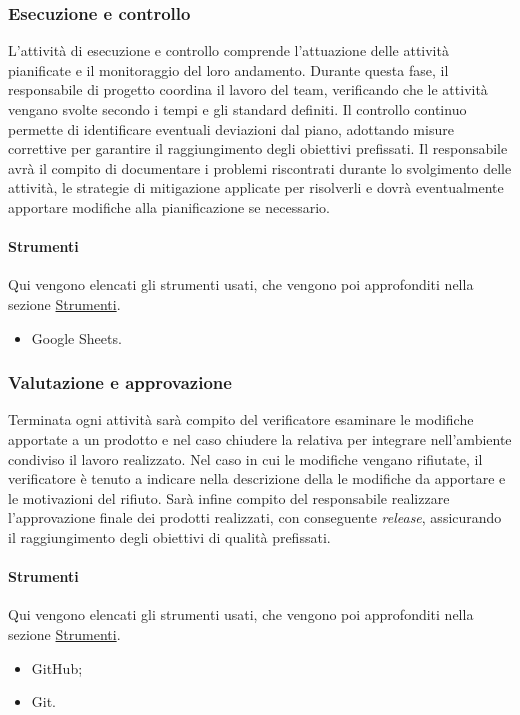 \subsubsection{Esecuzione e controllo}
L'attività di esecuzione e controllo comprende l'attuazione delle attività pianificate e il monitoraggio del loro andamento. 
Durante questa fase, il responsabile di progetto coordina il lavoro del team, verificando che le attività vengano svolte secondo i tempi e gli standard definiti. 
Il controllo continuo permette di identificare eventuali deviazioni dal piano, adottando misure correttive per garantire il raggiungimento degli obiettivi prefissati.
Il responsabile avrà il compito di documentare i problemi riscontrati durante lo svolgimento delle attività, le strategie di mitigazione applicate per risolverli e dovrà eventualmente
apportare modifiche alla pianificazione se necessario.

\paragraph{Strumenti}
Qui vengono elencati gli strumenti usati, che vengono poi approfonditi nella sezione \hyperref[sec:strumenti]{Strumenti}.
\begin{itemize}
    \item Google Sheets.
\end{itemize}

\subsubsection{Valutazione e approvazione}
Terminata ogni attività sarà compito del verificatore esaminare le modifiche apportate a un prodotto e nel caso chiudere la relativa  per integrare nell'ambiente condiviso il lavoro realizzato.
Nel caso in cui le modifiche vengano rifiutate, il verificatore è tenuto a indicare nella descrizione della  le modifiche da apportare e le motivazioni del rifiuto.
Sarà infine compito del responsabile realizzare l'approvazione finale dei prodotti realizzati, con conseguente \textit{release}, assicurando il raggiungimento degli obiettivi di qualità prefissati.

\paragraph{Strumenti}
Qui vengono elencati gli strumenti usati, che vengono poi approfonditi nella sezione \hyperref[sec:strumenti]{Strumenti}.
\begin{itemize}
    \item GitHub;
    \item Git.
\end{itemize}

